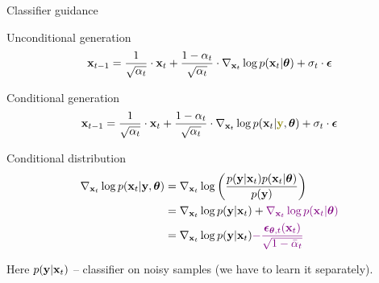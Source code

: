 \begin{frame}{Classifier guidance}
	\begin{block}{Unconditional generation}
		\vspace{-0.3cm}
		\[
			\mathbf{x}_{t - 1} = \frac{1}{\sqrt{\alpha_t}} \cdot \mathbf{x}_t + \frac{1 - \alpha_t}{\sqrt{\alpha_t}} \cdot  \nabla_{\mathbf{x}_t} \log p(\mathbf{x}_t | \boldsymbol{\theta}) +  \sigma_t \cdot \boldsymbol{\epsilon}
		\]
		\vspace{-0.5cm}
	\end{block}
	\begin{block}{Conditional generation}
		\vspace{-0.3cm}
		\[
			\bx_{t - 1} = \frac{1}{\sqrt{\alpha_t}} \cdot \bx_t + \frac{1 - \alpha_t}{\sqrt{\alpha_t}} \cdot  \nabla_{\bx_t} \log p(\bx_t | {\color{olive}\by}, \btheta) +  \sigma_t \cdot \bepsilon
		\]
		\vspace{-0.5cm}
	\end{block}
	\begin{block}{Conditional distribution}
		\vspace{-0.7cm}
		\begin{align*}
			\nabla_{\mathbf{x}_t} \log p(\mathbf{x}_t | \mathbf{y}, \boldsymbol{\theta}) &= \nabla_{\mathbf{x}_t} \log \left(\frac{p(\mathbf{y} | \mathbf{x}_t)p(\mathbf{x}_t | \boldsymbol{\theta})}{p(\mathbf{y})} \right)\\
			&= \nabla_{\mathbf{x}_t} \log p(\mathbf{y} | \mathbf{x}_t) + {\color{violet}\nabla_{\mathbf{x}_t} \log p(\mathbf{x}_t | \boldsymbol{\theta})}\\
			&= \nabla_{\mathbf{x}_t} \log p(\mathbf{y} | \mathbf{x}_t) {\color{violet}- \frac{\boldsymbol{\epsilon}_{\boldsymbol{\theta}, t}(\mathbf{x}_t)}{\sqrt{1 - \bar{\alpha}_t}}}
		\end{align*}
		\vspace{-0.7cm}
	\end{block}
	Here $p(\mathbf{y} | \mathbf{x}_t)$ -- classifier on noisy samples (we have to learn it separately).
\end{frame}
